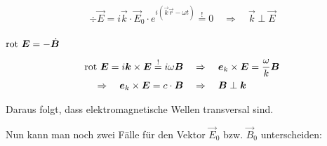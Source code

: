 \begin{equation*}
\div \vec{E} = i\vec{k}\cdot\vec{E}_0 \cdot e^{i(\vec{k}\vec{r} - \omega t)} \overset{!}{=} 0 \quad \Rightarrow \quad \vec{k}\perp\vec{E}
\end{equation*}
\ \\

\underline{$\text{rot }\bm{E} = - \dot{\bm{B}}$}

\begin{align*}
\text{rot }\bm{E} = i\bm{k}\times\bm{E} \overset{!}{=} i \omega\bm{B} \quad &\Rightarrow \quad \bm{e}_k\times\bm{E} = \frac{\omega}{k}\bm{B}\\
\Rightarrow\quad\bm{e}_k\times\bm{E} = c \cdot\bm{B} \quad &\Rightarrow \quad \bm{B} \perp \bm{k}
\end{align*}

Daraus folgt, dass elektromagnetische Wellen transversal sind.\

Nun kann man noch zwei Fälle für den Vektor $\vec{E}_0$ bzw. $\vec{B}_0$ unterscheiden:

